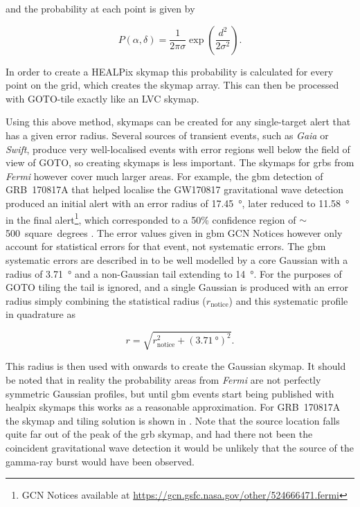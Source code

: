 \begin{colsection}
\begin{colsection}
and the probability at each point is given by

\begin{equation}
    P(\alpha, \delta) = \frac{1}{2\pi\sigma} \exp \left ( \frac{d^2}{2\sigma^2} \right ).
    \label{eq:gaussian_prob}
\end{equation}

In order to create a HEALPix skymap this probability is calculated for every point on the grid, which creates the skymap array. This can then be processed with GOTO-tile exactly like an LVC skymap.

Using this above method, skymaps can be created for any single-target alert that has a given error radius. Several sources of transient events, such as \textit{Gaia} or \textit{Swift}, produce very well-localised events with error regions well below the field of view of GOTO, so creating skymaps is less important. The skymaps for \glspl{grb} from \textit{Fermi} however cover much larger areas. For example, the \gls{gbm} detection of GRB~170817A that helped localise the GW170817 gravitational wave detection produced an initial alert with an error radius of \SI{17.45}{\degree}, later reduced to \SI{11.58}{\degree} in the final alert\footnote{GCN Notices available at \url{https://gcn.gsfc.nasa.gov/other/524666471.fermi}}, which corresponded to a 50\% confidence region of $\sim$500~square~degrees \citep{GW170817_Fermi}. The error values given in \gls{gbm} GCN Notices however only account for statistical errors for that event, not systematic errors. The \gls{gbm} systematic errors are described in \citet{Fermi_localisation} to be well modelled by a core Gaussian with a radius of \SI{3.71}{\degree} and a non-Gaussian tail extending to \SI{14}{\degree}. For the purposes of GOTO tiling the tail is ignored, and a single Gaussian is produced with an error radius simply combining the statistical radius ($r_\text{notice}$) and this  systematic profile in quadrature as

\begin{equation}
    r = \sqrt{r_\text{notice}^2 + {(\SI{3.71}{\degree})}^2}.
    \label{eq:fermi_radius}
\end{equation}

This radius is then used with  onwards to create the Gaussian skymap. It should be noted that in reality the probability areas from \textit{Fermi} are not perfectly symmetric Gaussian profiles, but until \gls{gbm} events start being published with \gls{healpix} skymaps this works as a reasonable approximation. For GRB~170817A the skymap and tiling solution is shown in . Note that the source location falls quite far out of the peak of the \gls{grb} skymap, and had there not been the coincident gravitational wave detection it would be unlikely that the source of the gamma-ray burst would have been observed.


\end{colsection}
\end{colsection}
